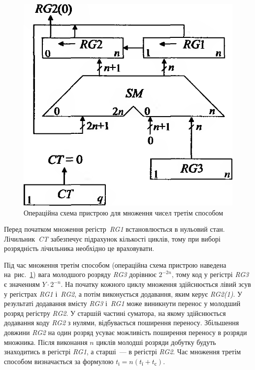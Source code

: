 \documentclass[a4paper,oneside,DIV=12,12pt]{scrartcl}
\newcommand{\schel}[1]{\textit{#1}}
\begin{document}
\begin{solution}
		\begin{figure}[!htbp]
		\centering
			\includegraphics[height = 10\baselineskip]{assets/01-multiplication-3rd-method-operation-scheme.png}
		\caption{Операційна схема пристрою для множення чисел третім способом}
		\label{fig:multiplication-3rd-method-operation-scheme}
		\end{figure}
		
		Перед початком множення регістр~\schel{RG1} встановлюється в нульовий стан. Лічильник~\schel{CT} забезпечує підрахунок кількості циклів, тому при виборі розрядність лічильника необхідно це враховувати.
		
		Під час множення третім способом (операційна схема пристрою наведена на~рис.~\ref{fig:multiplication-3rd-method-operation-scheme}) вага молодшого розряду \schel{RG3} дорівнює $2^{-2n}$, тому код у регістрі \schel{RG3} є значенням $Y \cdot 2^{-n}$. На початку кожного циклу множення здійснюється лівий зсув у регістрах \schel{RG1} і~\schel{RG2}, а потім виконується додавання, яким керує \schel{RG2(1)}. У результаті додавання вмісту \schel{RG3} і~\schel{RG1} може виникнути перенос у молодший розряд регістру \schel{RG2}. У старшій частині суматора, на якому здійснюється додавання коду \schel{RG2} з нулями, відбувається поширення переносу. Збільшення довжини \schel{RG2} на один розряд усуває можливість поширення переносу в розряди множника. Після виконання $n$ циклів молодші розряди добутку будуть знаходитись в регістрі \schel{RG1}, а старші~— в регістрі \schel{RG2}. Час множення третім способом визначається за формулою $t_{\text{і}} = n \left( t_{\text{ї}} + t_{\text{с}} \right)$.
	\end{solution}
	
\end{document}
